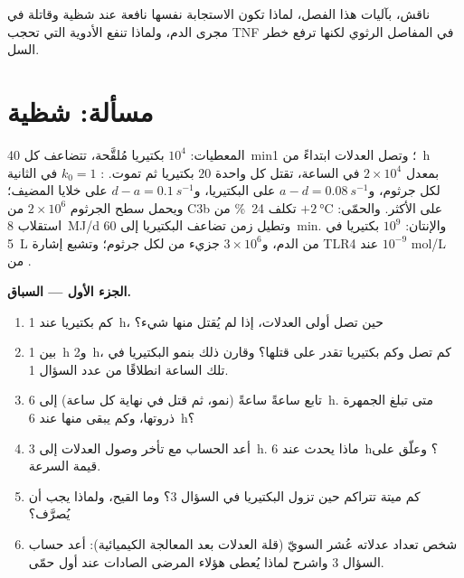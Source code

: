 \begin{exercise}[$\star\star\star$]\label{exo:b3:innate-immunity:12}
ناقش، بآليات هذا الفصل، لماذا تكون الاستجابة نفسها نافعة
عند شظية وقاتلة في مجرى الدم، ولماذا تنفع الأدوية التي تحجب
TNF في  المفاصل الرثوي لكنها ترفع خطر السل.
\end{exercise}

\section{مسألة: شظية}

\begin{problem}
\label{pb:b3:innate-immunity:1}
المعطيات: $10^{4}$ بكتيريا مُلقَّحة، تتضاعف كل \qty{40}{min}؛
وتصل العدلات ابتداءً من \qty{1}{h} بمعدل $2\times 10^{4}$ في
الساعة، تقتل كل واحدة $20$ بكتيريا ثم تموت. :
$k_{0} = 1$ في الثانية لكل جرثوم، و$a - d = \qty{0.08}{s^{-1}}$
على البكتيريا، و$d - a =
\qty{0.1}{s^{-1}}$ على خلايا المضيف؛
ويحمل سطح الجرثوم $2\times 10^{6}$ من C3b على الأكثر.
والحمّى: $+\qty{2}{\celsius}$ تكلف \qty{24}{\%} من استقلاب
\qty{8}{MJ/d} وتطيل زمن تضاعف البكتيريا إلى \qty{60}{min}.
والإنتان: $10^{9}$ بكتيريا في \qty{5}{L} من الدم،
و$3\times 10^{6}$ جزيء من  لكل جرثوم؛
وتشبع إشارة TLR4 عند $10^{-9}$ mol/L من .

\medskip
\noindent\textbf{الجزء الأول --- السباق.}
\begin{enumerate}
  \item كم بكتيريا عند \qty{1}{h}، حين تصل أولى العدلات، إذا
        لم يُقتل منها شيء؟
  \item بين \qty{1}{h} و\qty{2}{h}، كم  تصل وكم بكتيريا
        تقدر على قتلها؟ وقارن ذلك بنمو البكتيريا في تلك
        الساعة انطلاقًا من عدد السؤال 1.
  \item تابع ساعةً ساعةً (نمو، ثم قتل في نهاية كل ساعة) إلى
        \qty{6}{h}. متى تبلغ الجمهرة ذروتها، وكم يبقى منها
        عند \qty{6}{h}؟
  \item أعد الحساب مع تأخر وصول العدلات إلى \qty{3}{h}. ماذا
        يحدث عند \qty{6}{h}؟ وعلّق على قيمة السرعة.
  \item كم  ميتة تتراكم حين تزول البكتيريا في السؤال 3؟
        وما القيح، ولماذا يجب أن يُصرَّف؟
  \item شخص تعداد عدلاته عُشر السويّ (قلة العدلات بعد
        المعالجة الكيميائية): أعد حساب السؤال 3 واشرح لماذا
        يُعطى هؤلاء المرضى الصادات عند أول حمّى.
\end{enumerate}


\end{problem}
